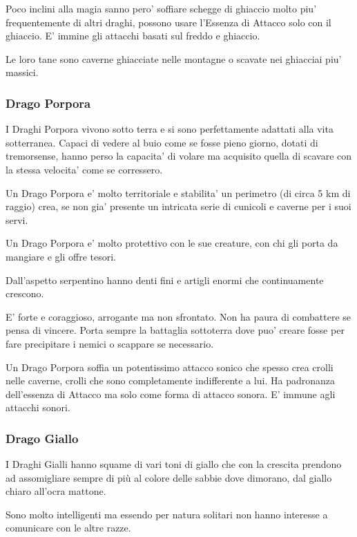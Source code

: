 \documentclass[a4paper,11pt,twoside,openany]{book}
\begin{document}
{Poco inclini alla magia sanno pero' soffiare schegge di ghiaccio molto piu' frequentemente di altri draghi, possono usare l'Essenza di Attacco solo con il ghiaccio. E' immine gli attacchi basati sul freddo e ghiaccio.

Le loro tane sono caverne ghiacciate nelle montagne o scavate nei ghiacciai piu' massici.


\subsubsection{Drago Porpora} 

I Draghi Porpora vivono sotto terra e si sono perfettamente adattati alla vita sotterranea.
Capaci di vedere al buio come se fosse pieno giorno, dotati di tremorsense, hanno perso la capacita' di volare ma acquisito quella di scavare con la stessa velocita' come se corressero.

Un Drago Porpora e' molto territoriale e stabilita' un perimetro (di circa 5 km di raggio) crea, se non gia' presente un intricata serie di cunicoli e caverne per i suoi servi.

Un Drago Porpora e' molto protettivo con le sue creature, con chi gli porta da mangiare e gli offre tesori.

Dall'aspetto serpentino hanno denti fini e artigli enormi che continuamente crescono.

E' forte e coraggioso, arrogante ma non sfrontato. Non ha paura di combattere se pensa di vincere. Porta sempre la battaglia sottoterra dove puo' creare fosse per fare precipitare i nemici o scappare se necessario.

Un Drago Porpora soffia un potentissimo attacco sonico che spesso crea crolli nelle caverne, crolli che sono completamente indifferente a lui. Ha padronanza dell'essenza di Attacco ma solo come forma di attacco sonora. E' immune agli attacchi sonori.


\subsubsection{Drago Giallo}  

I Draghi Gialli hanno squame di vari toni di giallo che con la crescita prendono ad assomigliare sempre di più al colore delle sabbie dove dimorano, dal giallo chiaro all'ocra mattone.

Sono molto intelligenti ma essendo per natura solitari non hanno interesse a comunicare con le altre razze. 

}
\end{document}
